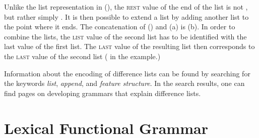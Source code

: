 \begin{enumerate}
Unlike the list representation in (), the \textsc{rest} value of the end of the list is not , but rather
simply . It is then possible to extend a list by adding another list to the point where it ends. The concatenation of 
() and (a) is (b).
\eal
\ex 
{}
\ex
{}
\zl
In order to combine the lists, the \textsc{list} value of the second list has to be identified with the {\sc
  last} value of the first list. The \textsc{last} value of the resulting list then corresponds to the
  \textsc{last} value of the second list ( in the example.)

Information about the encoding of difference lists can be found by searching for the keywords  \emph{list}, \emph{append}, and
\emph{feature structure}. In the search results, one can find pages on developing grammars that explain
difference lists.
\end{enumerate}



\section{Lexical Functional Grammar}

